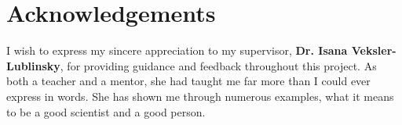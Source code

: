 \chapter*{Acknowledgements}
I wish to express my sincere appreciation to my supervisor, \textbf{Dr. Isana Veksler-Lublinsky}, for providing guidance and feedback throughout this project. As both a teacher and a mentor, she had taught me far more than I could ever express in words. She has shown me through numerous examples, what it means to be a good scientist and a good person.